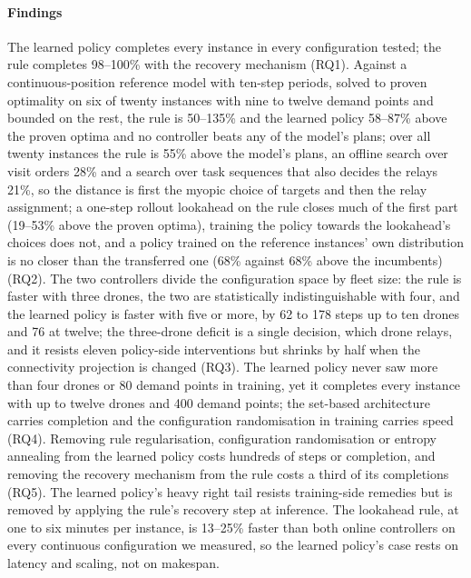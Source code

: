 \documentclass[final,5p,times,twocolumn]{elsarticle}
\begin{document}
\paragraph{Findings}
The learned policy completes every instance in every configuration tested; the rule
completes 98--100\% with the recovery mechanism (RQ1). Against a continuous-position reference
model with ten-step periods, solved to proven optimality on six of twenty instances with nine to
twelve demand points and bounded on the rest, the rule is 50--135\% and the learned policy
58--87\% above the proven optima and no controller beats any of the model's plans; over all twenty
instances the rule is 55\% above the model's plans, an offline search over visit orders 28\% and a
search over task sequences that also decides the relays 21\%, so the distance is first
the myopic choice of targets and then the relay assignment; a one-step rollout lookahead on the
rule closes much of the first part (19--53\% above the proven optima), training the policy
towards the lookahead's choices does not, and a policy trained on the reference instances' own
distribution is no closer than the transferred one (68\% against 68\% above the incumbents) (RQ2). The two controllers
divide the configuration space by fleet size: the rule is faster with three drones, the two
are statistically indistinguishable with four, and the learned policy is faster with five or more,
by 62 to 178 steps up to ten drones and 76 at twelve; the three-drone deficit is a single
decision, which drone relays, and it resists eleven policy-side interventions but shrinks by half
when the connectivity projection is changed (RQ3). The learned policy never saw more than four
drones or 80 demand points in training, yet it completes every instance with up to twelve drones and
400 demand points; the set-based architecture carries completion and the configuration
randomisation in training carries speed (RQ4). Removing rule regularisation, configuration
randomisation or entropy annealing from the learned policy costs hundreds of steps or completion,
and removing the recovery mechanism from the rule costs a third of its completions (RQ5).
The learned policy's heavy right tail resists training-side remedies but is removed by applying
the rule's recovery step at inference. The lookahead rule, at one to six minutes per instance, is
13--25\% faster than both online controllers on every continuous configuration we measured, so
the learned policy's case rests on latency and scaling, not on makespan.
\end{document}
